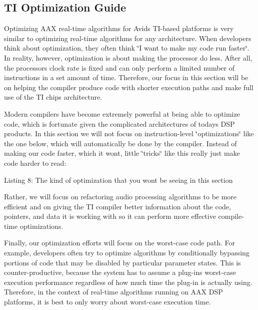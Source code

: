  \hypertarget{a00832_aax_ti_guide_06_ti_optimization_guide}{}\subsection{T\+I Optimization Guide}\label{a00832_aax_ti_guide_06_ti_optimization_guide}
Optimizing A\+AX real-\/time algorithms for Avid\textquotesingle{}s T\+I-\/based platforms is very similar to optimizing real-\/time algorithms for any architecture. When developers think about optimization, they often think \char`\"{}\+I want to make my code run faster\char`\"{}. In reality, however, optimization is about making the processor do less. After all, the processor\textquotesingle{}s clock rate is fixed and can only perform a limited number of instructions in a set amount of time. Therefore, our focus in this section will be on helping the compiler produce code with shorter execution paths and make full use of the TI chip\textquotesingle{}s architecture.

Modern compilers have become extremely powerful at being able to optimize code, which is fortunate given the complicated architectures of today\textquotesingle{}s D\+SP products. In this section we will not focus on instruction-\/level \char`\"{}optimizations\char`\"{} like the one below, which will automatically be done by the compiler. Instead of making our code faster, which it won\textquotesingle{}t, little \char`\"{}tricks\char`\"{} like this really just make code harder to read\+:


\begin{DoxyCode}{0}
\end{DoxyCode}
  Listing 8\+: The kind of optimization that you won\textquotesingle{}t be seeing in this section

Rather, we will focus on refactoring audio processing algorithms to be more efficient and on giving the TI compiler better information about the code, pointers, and data it is working with so it can perform more effective compile-\/time optimizations.

Finally, our optimization efforts will focus on the worst-\/case code path. For example, developers often try to optimize algorithms by conditionally bypassing portions of code that may be disabled by particular parameter states. This is counter-\/productive, because the system has to assume a plug-\/in\textquotesingle{}s worst-\/case execution performance regardless of how much time the plug-\/in is actually using. Therefore, in the context of real-\/time algorithms running on A\+AX D\+SP platforms, it is best to only worry about worst-\/case execution time.


